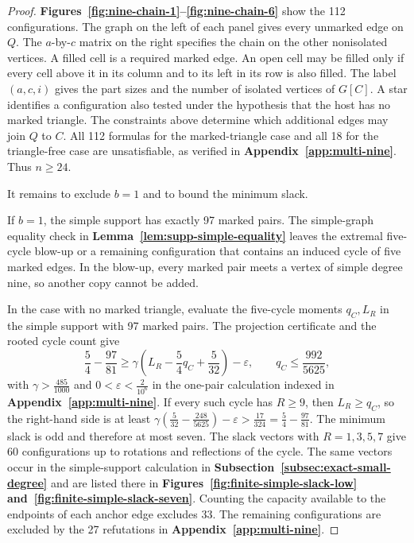 \begin{proof}
\textbf{Figures~\ref{fig:nine-chain-1}--\ref{fig:nine-chain-6}}
show the 112 configurations. The graph on the left of each panel
gives every unmarked edge on $Q$. The $a$-by-$c$ matrix on the right
specifies the chain on the other nonisolated vertices. A filled cell
is a required marked edge. An open cell may be filled only if every
cell above it in its column and to its left in its row is also filled.
The label $(a,c,i)$ gives the part sizes and the number of isolated
vertices of $G[C]$. A star identifies a configuration also tested
under the hypothesis that the host has no marked triangle.
The constraints above determine which additional edges may join
$Q$ to $C$. All 112 formulas for the marked-triangle case and all
18 for the triangle-free case are unsatisfiable, as verified in
\textbf{Appendix~\ref{app:multi-nine}}. Thus $n\geq24$.


It remains to exclude $b=1$ and to bound the minimum slack.

If $b=1$, the simple support has exactly 97 marked pairs.
The simple-graph equality check in \textbf{Lemma~\ref{lem:supp-simple-equality}}
leaves the extremal five-cycle blow-up or a remaining
configuration that contains an induced cycle of five
marked edges. In the blow-up, every marked pair meets a
vertex of simple degree nine, so another copy cannot be
added.

In the case with no marked triangle, evaluate the five-cycle moments
$q_C,L_R$ in the simple support with 97 marked pairs. The projection
certificate and the rooted cycle count give
\[
 \frac54-\frac{97}{81}\geq
 \gamma\left(L_R-\frac54 q_C+\frac5{32}\right)-\varepsilon,
 \qquad q_C\leq\frac{992}{5625},
\]
with $\gamma>\frac{485}{1000}$ and $0<\varepsilon<\frac{2}{10^6}$
in the one-pair calculation indexed in \textbf{Appendix~\ref{app:multi-nine}}.
If every such cycle has $R\ge9$, then $L_R\geq q_C$, so the
right-hand side is at least
$\gamma(\frac5{32}-\frac{248}{5625})-\varepsilon>
\frac{17}{324}=\frac54-\frac{97}{81}$.
The minimum slack is odd and therefore at most seven. The slack
vectors with $R=1,3,5,7$ give 60 configurations up to
rotations and reflections of the cycle. The same vectors occur in the
simple-support calculation in \textbf{Subsection~\ref{subsec:exact-small-degree}}
and are listed there in \textbf{Figures~\ref{fig:finite-simple-slack-low}
and~\ref{fig:finite-simple-slack-seven}}. Counting the
capacity available to the endpoints of each anchor edge
excludes 33. The remaining configurations are excluded by the
27 refutations in \textbf{Appendix~\ref{app:multi-nine}}.


\end{proof}
